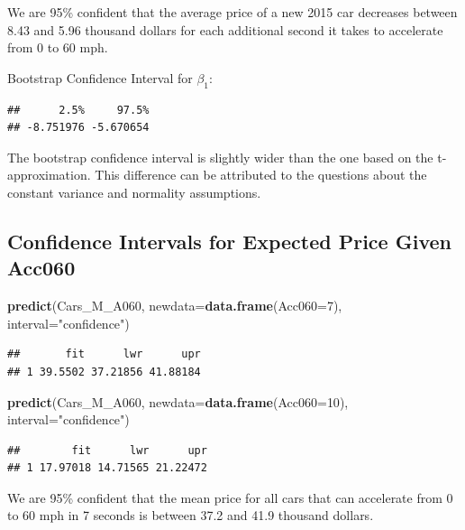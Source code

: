 \documentclass[]{book}
\newenvironment{Shaded}{\begin{snugshade}}{\end{snugshade}}
\newcommand{\KeywordTok}[1]{\textcolor[rgb]{0.13,0.29,0.53}{\textbf{#1}}}
\newcommand{\DataTypeTok}[1]{\textcolor[rgb]{0.13,0.29,0.53}{#1}}
\newcommand{\DecValTok}[1]{\textcolor[rgb]{0.00,0.00,0.81}{#1}}
\newcommand{\StringTok}[1]{\textcolor[rgb]{0.31,0.60,0.02}{#1}}
\newcommand{\NormalTok}[1]{#1}
\begin{document}
We are 95\% confident that the average price of a new 2015 car decreases
between 8.43 and 5.96 thousand dollars for each additional second it
takes to accelerate from 0 to 60 mph.

Bootstrap Confidence Interval for \(\beta_1\):

\begin{verbatim}
##      2.5%     97.5% 
## -8.751976 -5.670654
\end{verbatim}

The bootstrap confidence interval is slightly wider than the one based
on the t-approximation. This difference can be attributed to the
questions about the constant variance and normality assumptions.

\subsection{Confidence Intervals for Expected Price Given
Acc060}\label{confidence-intervals-for-expected-price-given-acc060}

\begin{Shaded}
\begin{Highlighting}[]
\KeywordTok{predict}\NormalTok{(Cars_M_A060, }\DataTypeTok{newdata=}\KeywordTok{data.frame}\NormalTok{(}\DataTypeTok{Acc060=}\DecValTok{7}\NormalTok{), }\DataTypeTok{interval=}\StringTok{"confidence"}\NormalTok{)}
\end{Highlighting}
\end{Shaded}

\begin{verbatim}
##       fit      lwr      upr
## 1 39.5502 37.21856 41.88184
\end{verbatim}

\begin{Shaded}
\begin{Highlighting}[]
\KeywordTok{predict}\NormalTok{(Cars_M_A060, }\DataTypeTok{newdata=}\KeywordTok{data.frame}\NormalTok{(}\DataTypeTok{Acc060=}\DecValTok{10}\NormalTok{), }\DataTypeTok{interval=}\StringTok{"confidence"}\NormalTok{)}
\end{Highlighting}
\end{Shaded}

\begin{verbatim}
##        fit      lwr      upr
## 1 17.97018 14.71565 21.22472
\end{verbatim}

We are 95\% confident that the mean price for all cars that can
accelerate from 0 to 60 mph in 7 seconds is between 37.2 and 41.9
thousand dollars.
\end{document}
